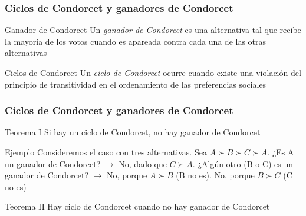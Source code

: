 \documentclass[14pt,aspectratio=169]{beamer}
\begin{document}
\begin{frame}\frametitle{Ciclos de Condorcet y ganadores de Condorcet}
\begin{block}{Ganador de Condorcet}
Un \textit{ganador de Condorcet} es una alternativa tal que recibe la
mayoría de los votos cuando es apareada contra cada una de las otras alternativas
\end{block}
\bigskip
\begin{block}{Ciclos de Condorcet}
Un \textit{ciclo de Condorcet} ocurre cuando existe una violación del
principio de transitividad en el ordenamiento de las preferencias sociales
\end{block}
\end{frame}


\begin{frame}\frametitle{Ciclos de Condorcet y ganadores de Condorcet}
\begin{block}{Teorema I}
Si hay un ciclo de Condorcet, no hay ganador de Condorcet
\end{block}
\begin{block}{Ejemplo}
Consideremos el caso con tres alternativas. Sea $A \succ B \succ C
\succ A$. ¿Es A un ganador de Condorcet? $\longrightarrow$ No, dado que $C
\succ A$. ¿Algún otro (B o C) es un ganador de Condorcet? $\longrightarrow$
 No, porque $A \succ B$ (B no es). No, porque $B \succ C$ (C no es)
\end{block}
\begin{block}{Teorema II}
Hay ciclo de Condorcet cuando no hay ganador de Condorcet
\end{block}
\end{frame}
\end{document}
